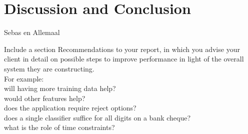 \section{Discussion and Conclusion}
\label{sec:DiscConcl}

Sebas en Allemaal

Include a section Recommendations to your report, in which you advise your client in detail on possible steps to improve performance in light of the overall system they are constructing. \\
For example:\\
will having more training data help?\\
would other features help? \\
does the application require reject options? \\
does a single classifier suffice for all digits on a bank cheque? \\
what is the role of time constraints?


